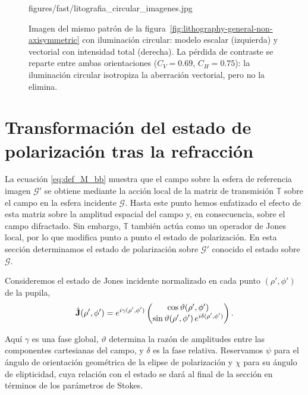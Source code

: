 \begin{figure}[!htbp]
  \centering
    {figures/fast/litografia_circular_imagenes.jpg}
  \caption{Imagen del mismo patrón de la
  figura~\ref{fig:lithography-general-non-axisymmetric} con iluminación
  circular: modelo escalar (izquierda) y vectorial con intensidad total
  (derecha). La pérdida de contraste se reparte entre ambas orientaciones
  ($C_V=0.69$, $C_H=0.75$): la iluminación circular isotropiza la aberración
  vectorial, pero no la elimina.}
  \label{fig:lithography-circular}
\end{figure}

\section{Transformación del estado de polarización tras la refracción}
\label{subsec:polarizacion_refraccion}

La ecuación \eqref{eq:def_M_bb} muestra que el campo sobre la esfera de
referencia imagen $\mathscr{G}'$ se obtiene mediante la acción local de la
matriz de transmisión $\mathbb{T}$ sobre el campo en la esfera incidente
$\mathscr{G}$. Hasta este punto hemos enfatizado el efecto de esta matriz
sobre la amplitud espacial del campo y, en consecuencia, sobre el campo
difractado. Sin embargo, $\mathbb{T}$ también actúa como un operador de Jones
local, por lo que modifica punto a punto el estado de polarización. En esta
sección determinamos el estado de polarización sobre $\mathscr{G}'$
conocido el estado sobre $\mathscr{G}$.

Consideremos el estado de Jones incidente normalizado en cada punto
$(\rho',\phi')$ de la pupila,
\begin{equation}
\hat{\vb J}(\rho',\phi')
=
e^{i\gamma(\rho',\phi')}
\begin{pmatrix}
\cos \vartheta(\rho',\phi') \\
\sin \vartheta(\rho',\phi')\, e^{i\delta(\rho',\phi')}
\end{pmatrix}.
\label{eq:jones_state_pupila}
\end{equation}

Aquí $\gamma$ es una fase global, $\vartheta$ determina la razón de
amplitudes entre las componentes cartesianas del campo, y $\delta$ es la fase
relativa. Reservamos $\psi$ para el ángulo de orientación geométrica de la
elipse de polarización y $\chi$ para su ángulo de elipticidad, cuya relación
con el estado se dará al final de la sección en términos de los parámetros
de Stokes.


